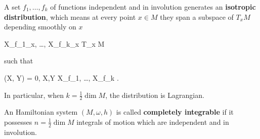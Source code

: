 \documentclass[main.tex]{subfiles}
\begin{document}
\begin{lemma}
\label{lemma:isotropic_dist}
	A set $f_1, \ldots, f_k$ of functions independent and in involution generates an \textbf{isotropic distribution}, which means at every point $x \in M$ they span a subspace of $T_xM$ depending smoothly on $x$
	\begin{eqalign}
		\langle X_{f_1}\vert_x, \ldots, X_{f_k}\vert_x \rangle {}\subseteq T_x M
	\end{eqalign}
	such that
	\begin{eqalign}
		\omega(X, Y) = 0, \quad \forall X,Y \in \langle X_{f_1}, \ldots, X_{f_k} \rangle.
	\end{eqalign}
	In particular, when $k = \frac12 \dim M$, the distribution is Lagrangian.
\end{lemma}

\begin{definition}
	An Hamiltonian system $(M, \omega, h)$ is called \textbf{completely integrable} if it possesses $n=\frac12 \dim M$ integrals of motion which are independent and in involution.
\end{definition}
\end{document}
